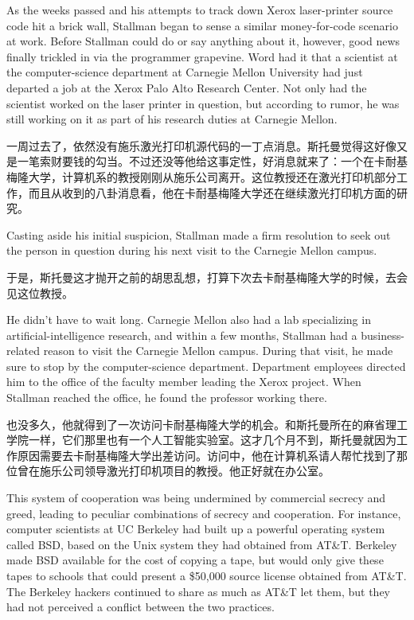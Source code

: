 \ifdefined\eng
As the weeks passed and his attempts to track down Xerox laser-printer source code hit a brick wall, Stallman began to sense a similar money-for-code scenario at work. Before Stallman could do or say anything about it, however, good news finally trickled in via the programmer grapevine. Word had it that a scientist at the computer-science department at Carnegie Mellon University had just departed a job at the Xerox Palo Alto Research Center. Not only had the scientist worked on the laser printer in question, but according to rumor, he was still working on it as part of his research duties at Carnegie Mellon.
\fi

\ifdefined\chs
一周过去了，依然没有施乐激光打印机源代码的一丁点消息。斯托曼觉得这好像又是一笔索财要钱的勾当。不过还没等他给这事定性，好消息就来了：一个在卡耐基梅隆大学，计算机系的教授刚刚从施乐公司离开。这位教授还在激光打印机部分工作，而且从收到的八卦消息看，他在卡耐基梅隆大学还在继续激光打印机方面的研究。
\fi

\ifdefined\eng
Casting aside his initial suspicion, Stallman made a firm resolution to seek out the person in question during his next visit to the Carnegie Mellon campus.
\fi

\ifdefined\chs
于是，斯托曼这才抛开之前的胡思乱想，打算下次去卡耐基梅隆大学的时候，去会见这位教授。
\fi

\ifdefined\eng
He didn't have to wait long. Carnegie Mellon also had a lab specializing in artificial-intelligence research, and within a few months, Stallman had a business-related reason to visit the Carnegie Mellon campus. During that visit, he made sure to stop by the computer-science department. Department employees directed him to the office of the faculty member leading the Xerox project. When Stallman reached the office, he found the professor working there.
\fi

\ifdefined\chs
也没多久，他就得到了一次访问卡耐基梅隆大学的机会。和斯托曼所在的麻省理工学院一样，它们那里也有一个人工智能实验室。这才几个月不到，斯托曼就因为工作原因需要去卡耐基梅隆大学出差访问。访问中，他在计算机系请人帮忙找到了那位曾在施乐公司领导激光打印机项目的教授。他正好就在办公室。
\fi
\fi

\ifdefined\vtwo
\ifdefined\eng
This system of cooperation was being undermined by commercial secrecy and greed, leading to peculiar combinations of secrecy and cooperation. For instance, computer scientists at UC Berkeley had built up a powerful operating system called BSD, based on the Unix system they had obtained from AT\&T. Berkeley made BSD available for the cost of copying a tape, but would only give these tapes to schools that could present a \$50,000 source license obtained from AT\&T. The Berkeley hackers continued to share as much as AT\&T let them, but they had not perceived a conflict between the two practices.
\fi

